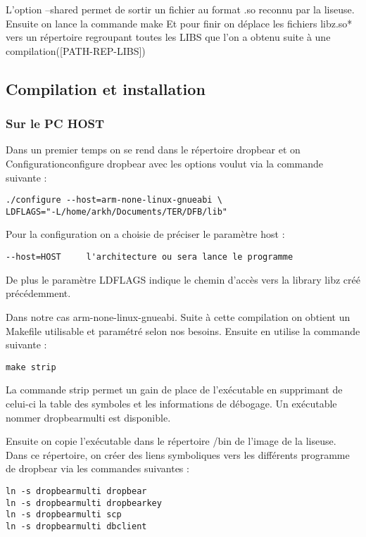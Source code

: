 L'option --shared permet de sortir un fichier au format .so reconnu par la liseuse.
Ensuite on lance la commande make
Et pour finir on déplace les fichiers libz.so* vers un répertoire regroupant toutes les LIBS que l'on a obtenu suite à une compilation([PATH-REP-LIBS]) 

\subsection{Compilation et installation}
\subsubsection{Sur le PC HOST}
Dans un premier temps on se rend dans le répertoire dropbear et on Configurationconfigure dropbear avec les options voulut via la commande suivante :

\begin{lstlisting}
./configure --host=arm-none-linux-gnueabi \
LDFLAGS="-L/home/arkh/Documents/TER/DFB/lib"
\end{lstlisting} 

Pour la configuration on a choisie de préciser le paramètre host :

\begin{lstlisting}
--host=HOST 	l'architecture ou sera lance le programme    
\end{lstlisting}

De plus le paramètre LDFLAGS indique le chemin d'accès vers la library libz créé précédemment.

Dans notre cas arm-none-linux-gnueabi.
Suite à cette compilation on obtient un Makefile utilisable et paramétré selon nos besoins.
Ensuite en utilise la commande suivante :

\begin{lstlisting}
make strip
\end{lstlisting}

La commande strip permet un gain de place de l'exécutable en supprimant de celui-ci la table des symboles et les informations de débogage. Un exécutable nommer dropbearmulti est disponible.

Ensuite on copie l'exécutable dans le répertoire /bin de l'image de la liseuse. Dans ce répertoire, on créer des liens symboliques vers les différents programme de dropbear via les commandes suivantes :

\begin{lstlisting}
ln -s dropbearmulti dropbear
ln -s dropbearmulti dropbearkey
ln -s dropbearmulti scp
ln -s dropbearmulti dbclient
\end{lstlisting}  


